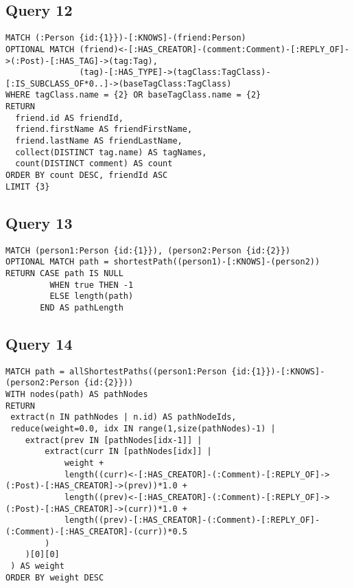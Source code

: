 \subsection{Query 12}

{\footnotesize
\begin{verbatim}
MATCH (:Person {id:{1}})-[:KNOWS]-(friend:Person)
OPTIONAL MATCH (friend)<-[:HAS_CREATOR]-(comment:Comment)-[:REPLY_OF]->(:Post)-[:HAS_TAG]->(tag:Tag),
               (tag)-[:HAS_TYPE]->(tagClass:TagClass)-[:IS_SUBCLASS_OF*0..]->(baseTagClass:TagClass)
WHERE tagClass.name = {2} OR baseTagClass.name = {2}
RETURN 
  friend.id AS friendId, 
  friend.firstName AS friendFirstName, 
  friend.lastName AS friendLastName, 
  collect(DISTINCT tag.name) AS tagNames, 
  count(DISTINCT comment) AS count
ORDER BY count DESC, friendId ASC
LIMIT {3}
\end{verbatim}
}

\subsection{Query 13}

{\footnotesize
\begin{verbatim}
MATCH (person1:Person {id:{1}}), (person2:Person {id:{2}})
OPTIONAL MATCH path = shortestPath((person1)-[:KNOWS]-(person2))
RETURN CASE path IS NULL
         WHEN true THEN -1 
         ELSE length(path) 
       END AS pathLength
\end{verbatim}
}

\subsection{Query 14}

{\footnotesize
\begin{verbatim}
MATCH path = allShortestPaths((person1:Person {id:{1}})-[:KNOWS]-(person2:Person {id:{2}}))
WITH nodes(path) AS pathNodes
RETURN
 extract(n IN pathNodes | n.id) AS pathNodeIds,
 reduce(weight=0.0, idx IN range(1,size(pathNodes)-1) |
    extract(prev IN [pathNodes[idx-1]] |
        extract(curr IN [pathNodes[idx]] |
            weight +
            length((curr)<-[:HAS_CREATOR]-(:Comment)-[:REPLY_OF]->(:Post)-[:HAS_CREATOR]->(prev))*1.0 +
            length((prev)<-[:HAS_CREATOR]-(:Comment)-[:REPLY_OF]->(:Post)-[:HAS_CREATOR]->(curr))*1.0 +
            length((prev)-[:HAS_CREATOR]-(:Comment)-[:REPLY_OF]-(:Comment)-[:HAS_CREATOR]-(curr))*0.5
        )
    )[0][0]
 ) AS weight
ORDER BY weight DESC
\end{verbatim}
}

